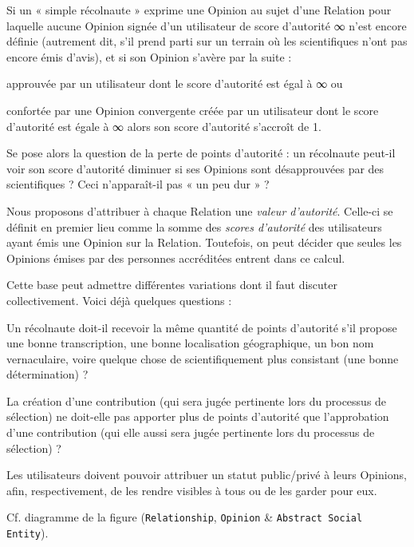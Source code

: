 \leafa{} Si un « simple récolnaute » exprime une Opinion au sujet d'une Relation pour laquelle aucune Opinion signée d'un utilisateur de score d'autorité ∞ n'est encore définie (autrement dit, s'il prend parti sur un terrain où les scientifiques n'ont pas encore émis d'avis), et si son Opinion s'avère par la suite :
\startitemize
	\item approuvée par un utilisateur dont le score d'autorité est égal à ∞ ou
	\item confortée par une Opinion convergente créée par un utilisateur dont le score d'autorité est égale à ∞
\stopitemize
alors son score d'autorité s'accroît de 1.

\bigskip

Se pose alors la question de la perte de points d'autorité : un récolnaute peut-il voir son score d'autorité diminuer si ses Opinions sont désapprouvées par des scientifiques ?
Ceci n'apparaît-il pas « un peu dur » ?

\startsubsection[title={Processus de sélection}]

\idea{} Nous proposons d'attribuer à chaque Relation une {\em valeur d'autorité}.
Celle-ci se définit en premier lieu comme la somme des {\em scores d'autorité} des utilisateurs ayant émis une Opinion sur la Relation.
Toutefois, on peut décider que seules les Opinions émises par des personnes accréditées entrent dans ce calcul.

Cette base peut admettre différentes variations dont il faut discuter collectivement.
Voici déjà quelques questions :

\startitemize
	\item Un récolnaute doit-il recevoir la même quantité de points d'autorité s'il propose une bonne transcription, une bonne localisation géographique, un bon nom vernaculaire, voire quelque chose de scientifiquement plus consistant (une bonne détermination) ?
	\item La création d'une contribution (qui sera jugée pertinente lors du processus de sélection) ne doit-elle pas apporter plus de points d'autorité que l'approbation d'une contribution (qui elle aussi sera jugée pertinente lors du processus de sélection) ?
\stopitemize

\startsubsection[title={Statut des Opinions}]

\fon{}
Les utilisateurs doivent pouvoir attribuer un statut public/privé à leurs Opinions, afin, respectivement, de les rendre visibles à tous ou de les garder pour eux.

\startsection[title={Éléments de modélisation}]

Cf. diagramme de la figure  ({\tt Relationship}, {\tt Opinion} & {\tt Abstract Social Entity}).
